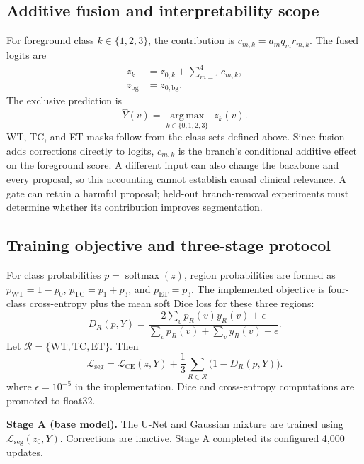 \documentclass[conference]{IEEEtran}
\begin{document}
\subsection{Additive fusion and interpretability scope}
For foreground class $k\in\{1,2,3\}$, the contribution is $c_{m,k}=a_m q_m r_{m,k}$. The fused logits are
\begin{equation}
\begin{aligned}
z_k&=z_{0,k}+\sum_{m=1}^{4}c_{m,k},\\
z_{\mathrm{bg}}&=z_{0,\mathrm{bg}}.
\end{aligned}
\label{eq:fusion}
\end{equation}
The exclusive prediction is
\begin{equation}
\hat Y(v)=\underset{k\in\{0,1,2,3\}}{\operatorname{arg\,max}}\;z_k(v).
\label{eq:prediction}
\end{equation}
WT, TC, and ET masks follow from the class sets defined above. Since fusion adds corrections directly to logits, $c_{m,k}$ is the branch's conditional additive effect on the foreground score. A different input can also change the backbone and every proposal, so this accounting cannot establish causal clinical relevance. A gate can retain a harmful proposal; held-out branch-removal experiments must determine whether its contribution improves segmentation.

\subsection{Training objective and three-stage protocol}
For class probabilities $p=\operatorname{softmax}(z)$, region probabilities are formed as $p_{\mathrm{WT}}=1-p_0$, $p_{\mathrm{TC}}=p_1+p_3$, and $p_{\mathrm{ET}}=p_3$. The implemented objective is four-class cross-entropy plus the mean soft Dice loss for these three regions:
\begin{equation}
D_R(p,Y)=\frac{2\sum_v p_R(v)y_R(v)+\epsilon}
{\sum_v p_R(v)+\sum_v y_R(v)+\epsilon}.
\label{eq:softdice}
\end{equation}
Let $\mathcal R=\{\mathrm{WT},\mathrm{TC},\mathrm{ET}\}$. Then
\begin{equation}
\mathcal L_{\mathrm{seg}}=\mathcal L_{\mathrm{CE}}(z,Y)
+\frac{1}{3}\sum_{R\in\mathcal R}\bigl(1-D_R(p,Y)\bigr).
\label{eq:seg}
\end{equation}
where $\epsilon=10^{-5}$ in the implementation. Dice and cross-entropy computations are promoted to float32.

\textbf{Stage A (base model).} The U-Net and Gaussian mixture are trained using $\mathcal L_{\mathrm{seg}}(z_0,Y)$. Corrections are inactive. Stage A completed its configured 4,000 updates.
\end{document}
